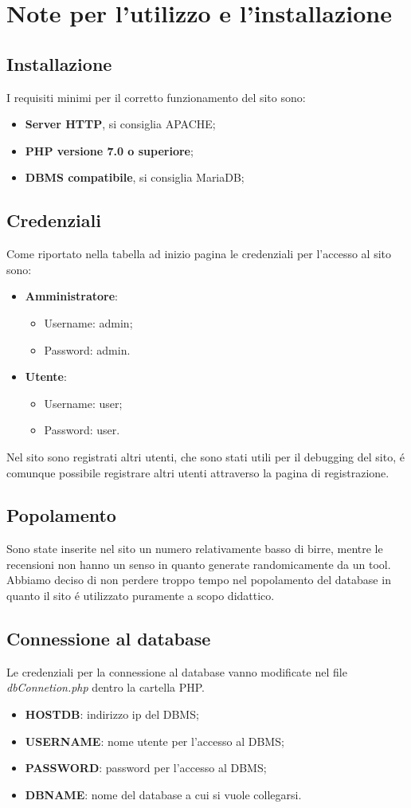 \section{Note per l'utilizzo e l'installazione}
\subsection{Installazione}
I requisiti minimi per il corretto funzionamento del sito sono:
\begin{itemize}
\item \textbf{Server HTTP}, si consiglia APACHE;
\item \textbf{PHP versione 7.0 o superiore};
\item \textbf{DBMS compatibile}, si consiglia MariaDB;
\end{itemize}
\subsection{Credenziali}
Come riportato nella tabella ad inizio pagina le credenziali per l'accesso al sito sono:
\begin{itemize}
\item \textbf{Amministratore}:
	\begin{itemize}
		\item Username: admin;
		\item Password: admin.
	\end{itemize}

\item \textbf{Utente}:
	\begin{itemize}
		\item Username: user;
		\item Password: user.
	\end{itemize}
\end{itemize}
Nel sito sono registrati altri utenti, che sono stati utili per il debugging del sito, é comunque possibile registrare altri utenti attraverso la pagina di registrazione.
\subsection{Popolamento}
Sono state inserite nel sito un numero relativamente basso di birre, mentre le recensioni non hanno un senso in quanto generate randomicamente da un tool. Abbiamo deciso di non perdere troppo tempo nel popolamento del database in quanto il sito é utilizzato puramente a scopo didattico.
\subsection{Connessione al database}
Le credenziali per la connessione al database vanno modificate nel file \textit{dbConnetion.php} dentro la cartella PHP.
\begin{itemize}
\item \textbf{HOST\textunderscore DB}: indirizzo ip del DBMS;
\item \textbf{USERNAME}: nome utente per l'accesso al DBMS;
\item \textbf{PASSWORD}: password per l'accesso al DBMS;
\item \textbf{DB\textunderscore NAME}: nome del database a cui si vuole collegarsi.
\end{itemize}